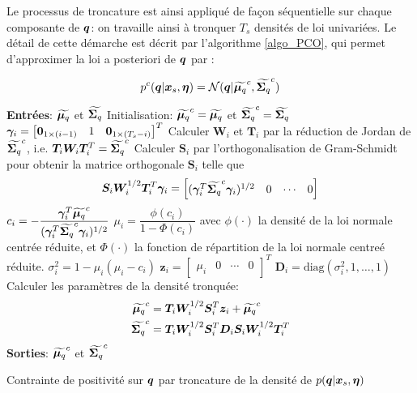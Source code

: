 {Le processus de troncature est ainsi appliqué de façon séquentielle sur chaque composante de ${\bm{q}}$: on travaille ainsi à tronquer $T_s$ densités de loi univariées. Le détail de cette démarche est décrit par l'algorithme \ref{algo_PCO}, qui permet d'approximer la loi a posteriori  de ${\bm{q}}$ par : 

\begin{equation}
p^c({\bm{q}} | {\bm{x}_s}, {\bm{\eta}}) = \mathcal{N}({\bm{q}} | {\widetilde{\bm{\mu}_q}}^c, {\widetilde{\bm{\Sigma}_q}}^c)
\label{eq_AE_16}
\end{equation}

\begin{algorithm}
\begin{algorithmic}
	\State \textbf{Entrées}: ${\widetilde{\bm{\mu}_q}}$ et ${\widetilde{\bm{\Sigma}_q}}$
	\State Initialisation: ${\widetilde{\bm{\mu}_q}}^c={\widetilde{\bm{\mu}_q}}$ et ${\widetilde{\bm{\Sigma}_q}}^c={\widetilde{\bm{\Sigma}_q}}$
		\State ${\bm \gamma}_i=\begin{bmatrix}{\bf 0}_{1\times (i-1)} & 1  & {\bf 0}_{1\times (T_s-i)}\end{bmatrix}^T$
		\State Calculer ${\bm W}_i$ et ${\bm T}_i$ par la réduction de Jordan de ${\widetilde{\bm{\Sigma}_q}}^c$, i.e. ${\bm T}_i {\bm W}_i {\bm T}_i^T={\widetilde{\bm{\Sigma}_q}}^c$
		\State Calculer ${\bm S}_i$ par l'orthogonalisation de Gram-Schmidt pour obtenir la matrice orthogonale ${\bm S}_i$ telle que $${\bm S}_i {\bm W}_i^{1/2} {\bm T}_i^T {\bm \gamma}_i=\begin{bmatrix}
		({\bm \gamma}_i^T {\widetilde{\bm{\Sigma}_q}}^c {\bm \gamma}_i)^{1/2} & 0 & \cdots & 0 
		\end{bmatrix} $$
		 $c_i=-\dfrac{{\bm \gamma}_i^T {\widetilde{\bm{\mu}_q}}^c}{({\bm \gamma}_i^T {\widetilde{\bm{\Sigma}_q}}^c {\bm \gamma}_i)^{1/2}}$
		 \State $\mu_i=\dfrac{\phi(c_i)}{1-\Phi(c_i)}$ avec $\phi(\cdot)$ la densité de la loi normale centrée réduite, et $\Phi(\cdot)$ la fonction de répartition de la loi normale centreé réduite.
		 \State $\sigma^2_i=1-\mu_i(\mu_i-c_i)$
		 \State ${\bm z}_i=\begin{bmatrix}\mu_i & 0 & \cdots & 0 \end{bmatrix}^T$
		 \State ${\bm D}_i=\text{diag}(\sigma^2_i,1,\ldots,1)$
		\State Calculer les paramètres de la densité tronquée:
		\State \begin{align*}
		\begin{split}
		{\widetilde{\bm{\mu}_q}}^c&={\bm T}_i {\bm W}_i^{1/2} {\bm S}_i ^T{\bm z}_i + {\widetilde{\bm{\mu}_q}}^c\\
		{\widetilde{\bm{\Sigma}_q}}^c&={\bm T}_i {\bm W}_i^{1/2} {\bm S}_i^T {\bm D}_i  {\bm S}_i {\bm W}_i^{1/2} {\bm T}_i ^T \\
		\end{split}
		\end{align*}
	\EndFor
	\State \textbf{Sorties}: ${\widetilde{\bm{\mu}_q}}^c$ et ${\widetilde{\bm{\Sigma}_q}}^c$
	\end{algorithmic}
	\caption{Contrainte de positivité sur ${\bm{q}}$ par troncature de la densité de $p({\bm{q}} | {\bm{x}_s}, {\bm{\eta}})$}
	\label{algo_PCO}
\end{algorithm}

}
